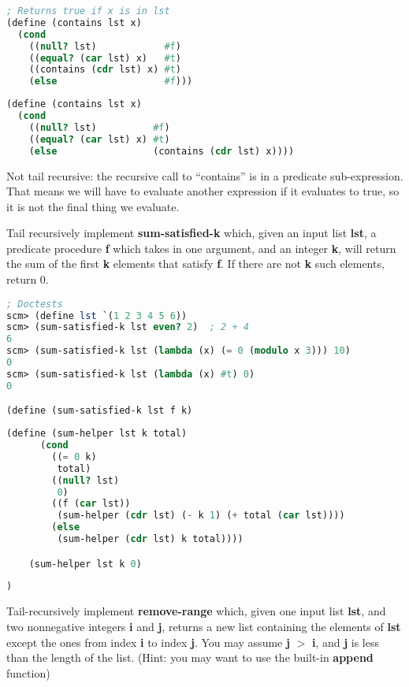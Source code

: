 \begin{lstlisting}[language=Scheme]
; Returns true if x is in lst
(define (contains lst x)
  (cond
    ((null? lst)            #f)
    ((equal? (car lst) x)   #t)
    ((contains (cdr lst) x) #t)
    (else                   #f)))
\end{lstlisting}

\begin{solution}
\begin{lstlisting}[language=Scheme]
(define (contains lst x)
  (cond
    ((null? lst)          #f)
    ((equal? (car lst) x) #t)
    (else                 (contains (cdr lst) x))))
\end{lstlisting}
Not tail recursive: the recursive call to ``contains'' is in a predicate sub-expression. That means we will have to evaluate another expression if it evaluates to true, so it is not the final thing we evaluate.
\end{solution}
\newpage

\question
Tail recursively implement \textbf{sum-satisfied-k} which, given an input list \textbf{lst}, a predicate procedure \textbf{f} which takes in one argument, and an integer \textbf{k}, will return the sum of the first \textbf{k} elements that satisfy \textbf{f}. If there are not \textbf{k} such elements, return 0.

\begin{lstlisting}[language=Scheme]
; Doctests
scm> (define lst `(1 2 3 4 5 6))
scm> (sum-satisfied-k lst even? 2)  ; 2 + 4
6
scm> (sum-satisfied-k lst (lambda (x) (= 0 (modulo x 3))) 10)
0
scm> (sum-satisfied-k lst (lambda (x) #t) 0)
0

(define (sum-satisfied-k lst f k)
\end{lstlisting}
\begin{solution}[2.5in]
\begin{lstlisting}[language=Scheme]
    (define (sum-helper lst k total)
      (cond
        ((= 0 k)
         total)
        ((null? lst)
         0)
        ((f (car lst))
         (sum-helper (cdr lst) (- k 1) (+ total (car lst))))
        (else
         (sum-helper (cdr lst) k total))))

    (sum-helper lst k 0)
\end{lstlisting}
\end{solution}
\begin{lstlisting}[language=Scheme]
)
\end{lstlisting}


\question
Tail-recursively implement \textbf{remove-range} which, 
given one input list \textbf{lst}, and two nonnegative integers \textbf{i} and \textbf{j}, 
returns a new list containing the elements of \textbf{lst} except 
the ones from index \textbf{i} to index \textbf{j}. 
You may assume \textbf{j} $>$ \textbf{i}, 
and \textbf{j} is less than the length of the list. 
(Hint: you may want to use the built-in \textbf{append} function)

